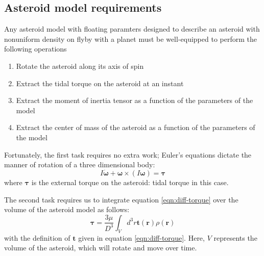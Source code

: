 \documentclass[aps,twocolumn,secnumarabic,balancelastpage,amsmath,amssymb,nofootinbib,floatfix]{revtex4-1}
\begin{document}
\subsection{Asteroid model requirements}
\label{sec:requirements}
Any asteroid model with floating paramters designed to describe an asteroid with nonuniform density on flyby with a planet must be well-equipped to perform the following operations

\begin{enumerate}
    \item Rotate the asteroid along its axis of spin
    \item Extract the tidal torque on the asteroid at an instant
    \item Extract the moment of inertia tensor as a function of the parameters of the model
    \item Extract the center of mass of the asteroid as a function of the parameters of the model
\end{enumerate}
Fortunately, the first task requires no extra work; Euler's equations dictate the manner of rotation of a three dimensional body:
\begin{equation}
    I\dot{\bm{\omega}} + \bm \omega \times (I \bm \omega) = \bm \tau
    \label{eqn:euler}
\end{equation}
where $\bm \tau$ is the external torque on the asteroid: tidal torque in this case.

The second task requires us to integrate equation \ref{eqn:diff-torque} over the volume of the asteroid model as follows:
\begin{equation}
    \bm{\tau} =  \frac{3\mu}{D^3}\int_{V} d^3 r \bm{t}(\bm{r}) \rho(\bm r) 
    \label{eqn:total-torque}
\end{equation}
with the definition of $\bm{t}$ given in equation \ref{eqn:diff-torque}. Here, $V$ represents the volume of the asteroid, which will rotate and move over time.
\end{document}
